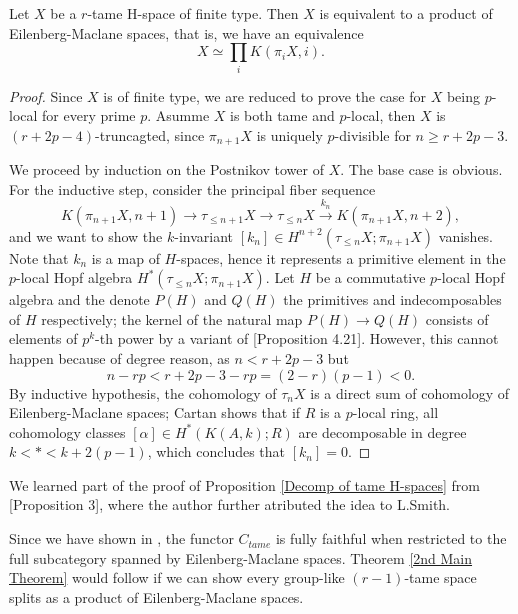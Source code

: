 \begin{proposition}
\label{Decomp of tame H-spaces}
	Let $X$ be a $r$-tame H-space of finite type. Then $X$ is equivalent to a product of Eilenberg-Maclane spaces, that is, we have an equivalence
	\[
	X \simeq \prod_i K(\pi_i X, i).
	\]
\end{proposition}
\begin{proof}
Since $X$ is of finite type, we are reduced to prove the case for $X$ being $p$-local for every prime $p$. Asumme $X$ is both tame and $p$-local, then $X$ is $(r+2p-4)$-truncagted, since $\pi_{n+1}X$ is uniquely $p$-divisible  for $n \geq r+2p-3$.

	We proceed by induction on the Postnikov tower of $X$.
	The base case is obvious. 	
	For the inductive step, consider the principal fiber sequence
	$$
	K(\pi_{n+1}X,n+1)\to 
	\tau_{\leq n+1}X
	\to
	\tau_{\leq n}X
	\xrightarrow{k_n}
	K(\pi_{n+1}X,n+2),
	$$
	and we want to show the $k$-invariant $[k_n]\in H^{n+2}(\tau_{\leq n}X; \pi_{n+1}X)$ vanishes. 
	Note that $k_n$ is a map of $H$-spaces, hence it represents a primitive element in the $p$-local Hopf algebra $H^*(\tau_{\leq n}X; \pi_{n+1}X)$. Let $H$ be a commutative $p$-local Hopf algebra and the denote $P(H)$ and $Q(H)$ the primitives and indecomposables of $H$ respectively; the kernel of the natural map $P(H)\to Q(H)$ consists of elements of $p^k$-th power by a variant of \cite{Milnor-Moore}[Proposition 4.21]. However, this cannot happen because of degree reason, as
	$n<r+2p-3$ but
	\[
	n-rp<r+2p-3-rp= (2-r)(p-1)<0.
	\]
 	By inductive hypothesis, the cohomology of $\tau_n X$ is a direct sum of cohomology of Eilenberg-Maclane spaces;
	 Cartan shows that if $R$ is a $p$-local ring, all cohomology classes  $[\alpha]\in H^{*}(K(A,k);R)$ are decomposable in degree $k<*<k+2(p-1)$, which concludes that $[k_n]=0$.
\end{proof}
\begin{remark}
		We learned part of the proof of Proposition \ref{Decomp of tame H-spaces} from \cite{soule}[Proposition 3], where the author further atributed the idea to L.Smith.	
\end{remark}

Since we have shown in , the functor $C_{tame}$ is fully faithful when restricted to the full subcategory spanned by Eilenberg-Maclane spaces. 
Theorem \ref{2nd Main Theorem} would follow if we can show every group-like $(r-1)$-tame space splits as a product of Eilenberg-Maclane spaces.



